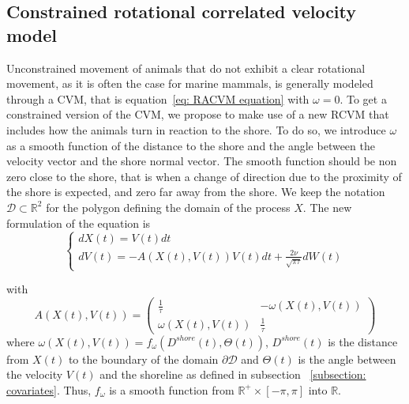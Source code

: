 \documentclass[11pt]{article}
\newcommand {\R}{\mathbb{R}}
\newcommand {\1}{\mathbb{1}}
\begin{document}
\subsection{Constrained rotational correlated velocity model}
\label{section: CRCVM}


Unconstrained movement of animals that do not exhibit a clear rotational movement, as it is often the case for marine mammals, is generally modeled through a CVM, that is equation~\ref{eq: RACVM equation} with $\omega=0$.
To get a constrained version of the CVM, we propose to make use of a new RCVM that includes how the animals turn in reaction to the shore. To do so, we introduce $\omega$ as a smooth function of the distance to the shore and the angle between the velocity vector and the shore normal vector. 
The smooth function should be non zero close to the shore, that is when a change of direction due to the proximity of the shore is expected, and  zero far away from the shore. 
We keep the notation $\mathcal{D} \subset \R^2$ for the polygon defining the domain of the process $X$. The new formulation of the equation is 
\begin{equation} \left\{
	\begin{array}{l}
		dX(t)=V(t) dt \\
		dV(t)=-A(X(t),V(t))V(t)dt+\frac{2\nu}{\sqrt{\pi \tau}} dW(t) 
		
	\end{array}
	\right.
	\label{eq: CRCVM equation}
\end{equation}

with 
\begin{equation} 
		A(X(t),V(t))=\begin{pmatrix} 
			\frac{1}{\tau} & -\omega(X(t),V(t)) \\
			\omega(X(t),V(t)) & \frac{1}{\tau}
		\end{pmatrix}
	\label{eq: CRCVM matrix A}
\end{equation}
where $\omega(X(t),V(t))=f_{\omega}(D^{shore}(t),\Theta(t))$, $D^{shore}(t)$ is the distance from $X(t)$ to the boundary of the domain $\partial \mathcal{D}$
and $\Theta(t)$ is the angle between the velocity $V(t)$ and the shoreline as defined in subsection ~\ref{subsection: covariates}. Thus, $f_{\omega}$ is a smooth function from $\R^{+} \times [-\pi,\pi]$ into $\R$.
\end{document}
